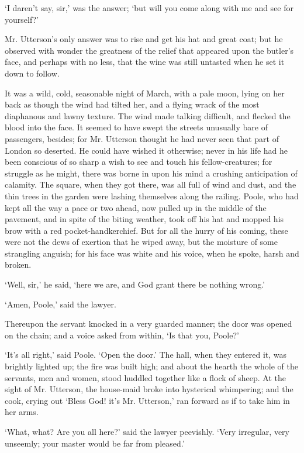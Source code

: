 \documentclass[]{novel}
\begin{document}
‘I daren’t say, sir,’ was the answer; ‘but will you come along with me and see for yourself?’

Mr. Utterson’s only answer was to rise and get his hat and great coat; but he observed with wonder the greatness of the relief that appeared upon the butler’s face, and perhaps with no less, that the wine was still untasted when he set it down to follow.

It was a wild, cold, seasonable night of March, with a pale moon, lying on her back as though the wind had tilted her, and a flying wrack of the most diaphanous and lawny texture. The wind made talking difficult, and flecked the blood into the face. It seemed to have swept the streets\- unusually bare of passengers, besides; for Mr. Utterson thought he had never seen that part of London so deserted. He could have wished it otherwise; never in his life had he been conscious of so sharp a wish to see and touch his fellow-creatures; for struggle as he might, there was borne in upon his mind a crushing anticipation of calamity. The square, when they got there, was all full of wind and dust, and the thin trees in the garden were lashing themselves along the railing. Poole, who had kept all the way a pace or two ahead, now pulled up in the middle of the pavement, and in spite of the biting weather, took off his hat and mopped his brow with a red pocket-handkerchief. But for all the hurry of his coming, these were not the dews of exertion that he wiped away, but the moisture of some strangling anguish; for his face was white and his voice, when he spoke, harsh and broken.

‘Well, sir,’ he said, ‘here we are, and God grant there be nothing wrong.’

‘Amen, Poole,’ said the lawyer.

Thereupon the servant knocked in a very guarded manner; the door was opened on the chain; and a voice asked from within, ‘Is that you, Poole?’

‘It’s all right,’ said Poole. ‘Open the door.’ The hall, when they entered it, was brightly lighted up; the fire was built high; and about the hearth the whole of the servants, men and women, stood huddled together like a flock of sheep. At the sight of Mr. Utterson, the house-maid broke into hysterical whimpering; and the cook, crying out ‘Bless God! it’s Mr. Utterson,’ ran forward as if to take him in her arms.

‘What, what? Are you all here?’ said the lawyer peevishly. ‘Very irregular, very unseemly; your master would be far from pleased.’
\end{document}
